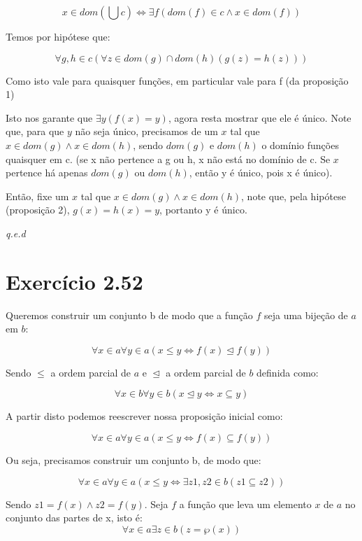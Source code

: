 \documentclass[12pt]{extarticle}
\newcommand{\fim}{\begin{flushright}

   \emph{q.e.d}
\end{flushright}}
\begin{document}
\begin{equation}
    x \in dom (\bigcup c) \Leftrightarrow \exists f (dom (f) \in c \land x \in dom (f))
\end{equation}

Temos por hipótese que:

\begin{equation}
   \forall g,h \in c (\forall z \in dom(g) \cap dom(h) (g(z) = h(z))) 
\end{equation}

Como isto vale para quaisquer funções, em particular vale para f (da proposição 1)

Isto nos garante que $\exists y (f(x) = y)$, agora resta mostrar que ele é único. Note que, para que $y$ não seja único, precisamos de um $x$ tal que $x \in dom(g) \land x \in dom(h)$, sendo $dom(g)$ e $dom(h)$ o domínio funções quaisquer em c.  (se x não pertence a g ou h, x não está no domínio de c. Se $x$ pertence há apenas $dom(g)$ ou $dom(h)$, então y é único, pois x é único).

Então, fixe um $x$ tal que $x \in dom(g) \land x \in dom(h)$, note que, pela hipótese (proposição 2), $g(x) = h(x) = y$, portanto y é único.

\fim

\section{Exercício 2.52}

Queremos construir um conjunto b de modo que a função $f$ seja uma bijeção de $a$ em $b$:

$$
\forall x \in a \forall y \in a (x \leq y \Leftrightarrow f(x) \trianglelefteq f(y))
$$

Sendo $\leq$ a ordem parcial de $a$ e $\trianglelefteq$ a ordem parcial de $b$ definida como:

$$
\forall x \in b \forall y \in b (x \trianglelefteq y \Leftrightarrow x \subseteq y)
$$

A partir disto podemos reescrever nossa proposição inicial como:

$$
\forall x \in a \forall y \in a (x \leq y \Leftrightarrow f(x) \subseteq f(y))
$$

Ou seja, precisamos construir um conjunto b, de modo que:

$$
\forall x \in a \forall y \in a (x \leq y \Leftrightarrow \exists z1, z2 \in b (z1 \subseteq z2))
$$

Sendo $z1 = f(x) \land z2 = f(y)$. Seja $f$ a função que leva um elemento $x$ de $a$ no conjunto das partes de x, isto é:
$$
\forall x \in a \exists z \in b (z = \wp (x))
$$
\end{document}
